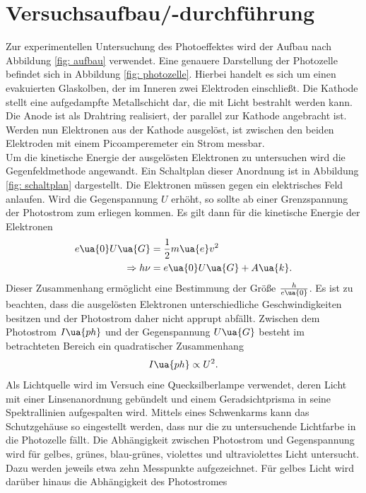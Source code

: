 \section{Versuchsaufbau/-durchführung}
Zur experimentellen Untersuchung des Photoeffektes wird der Aufbau nach Abbildung \ref{fig: aufbau} verwendet. Eine
genauere Darstellung der Photozelle befindet sich in Abbildung \ref{fig: photozelle}. Hierbei handelt es sich um einen
evakuierten Glaskolben, der im Inneren zwei Elektroden einschließt. Die Kathode stellt eine aufgedampfte
Metallschicht dar, die mit Licht bestrahlt werden kann. Die Anode ist als Drahtring realisiert, der parallel
zur Kathode angebracht ist. Werden nun Elektronen aus der Kathode ausgelöst, ist zwischen den beiden Elektroden
mit einem Picoamperemeter ein Strom messbar. \\ %
Um die kinetische Energie der ausgelösten Elektronen zu untersuchen wird die Gegenfeldmethode angewandt. Ein Schaltplan
dieser Anordnung ist in Abbildung \ref{fig: schaltplan} dargestellt. Die Elektronen müssen gegen ein elektrisches Feld anlaufen.
Wird die Gegenspannung $U$ erhöht, so sollte ab einer Grenzspannung der Photostrom zum erliegen kommen. Es gilt dann
für die kinetische Energie der Elektronen
\begin{align}
  \label{eq:regress}
\begin{aligned}
  e\ua{0} U\ua{G} &= \frac{1}{2}m\ua{e}v^2 \\
  \Rightarrow h\nu &= e\ua{0}U\ua{G} + A\ua{k}.
\end{aligned}
\end{align}
Dieser Zusammenhang ermöglicht eine Bestimmung der Größe $\frac{h}{e\ua{0}}$. Es ist zu beachten, dass
die ausgelösten Elektronen unterschiedliche Geschwindigkeiten besitzen und der Photostrom daher nicht apprupt
abfällt. Zwischen dem Photostrom $I\ua{ph}$ und der Gegenspannung $U\ua{G}$ besteht im betrachteten Bereich ein quadratischer Zusammenhang
\begin{equation}
  I\ua{ph} \propto U^2.
\end{equation}
Als Lichtquelle wird im Versuch eine Quecksilberlampe verwendet, deren Licht mit einer Linsenanordnung gebündelt
und einem Geradsichtprisma in seine Spektrallinien aufgespalten wird. Mittels eines Schwenkarms kann das Schutzgehäuse
so eingestellt werden, dass nur die zu untersuchende Lichtfarbe in die Photozelle fällt. Die Abhängigkeit zwischen
Photostrom und Gegenspannung wird für gelbes, grünes, blau-grünes, violettes und ultraviolettes Licht untersucht. Dazu
werden jeweils etwa zehn Messpunkte aufgezeichnet. Für gelbes Licht wird darüber hinaus die Abhängigkeit des Photostromes
